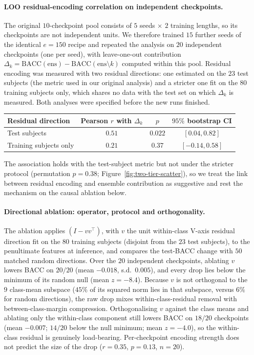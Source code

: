 \begin{revblock}
\paragraph{LOO residual-encoding correlation on independent checkpoints.}
The original $10$-checkpoint pool consists of $5$ seeds $\times$ $2$
training lengths, so its checkpoints are not independent units. We
therefore trained $15$ further seeds of the identical $e{=}150$ recipe
and repeated the analysis on $20$ independent checkpoints (one per seed),
with leave-one-out contribution $\Delta_k=\mathrm{BACC}(\mathrm{ens})-
\mathrm{BACC}(\mathrm{ens}\setminus k)$ computed within this pool. Residual
encoding was measured with two residual directions: one estimated on the
$23$ test subjects (the metric used in our original analysis) and a
stricter one fit on the $80$ training subjects only, which shares no data
with the test set on which $\Delta_k$ is measured. Both analyses were
specified before the new runs finished.

\begin{center}
\small
\begin{tabular}{lccc}
\toprule
Residual direction & Pearson $r$ with $\Delta_k$ & $p$ & $95\%$ bootstrap CI \\
\midrule
Test subjects   & $0.51$ & $0.022$ & $[0.04, 0.82]$ \\
Training subjects only & $0.21$ & $0.37$ & $[-0.14, 0.58]$ \\
\bottomrule
\end{tabular}
\end{center}
The association holds with the test-subject metric but not under the
stricter protocol (permutation $p{=}0.38$; Figure~\ref{fig:two-tier-scatter}), so we treat the link between
residual encoding and ensemble contribution as suggestive and rest the
mechanism on the causal ablation below.

\paragraph{Directional ablation: operator, protocol and orthogonality.} The
ablation applies $(I-vv^\top)$, with $v$ the unit within-class V-axis
residual direction fit on the $80$ training subjects (disjoint from the
$23$ test subjects), to the penultimate features at inference, and
compares the test-BACC change with $50$ matched random directions. Over
the $20$ independent checkpoints, ablating $v$ lowers BACC on $20/20$
(mean $-0.018$, s.d.\ $0.005$), and every drop lies below the minimum of
its random null (mean $z{=}{-}8.4$). Because $v$ is not orthogonal to the
$9$ class-mean subspace ($45\%$ of its squared norm lies in that
subspace, versus $6\%$ for random directions), the raw drop mixes
within-class-residual removal with between-class-margin compression.
Orthogonalising $v$ against the class means and ablating only the
within-class component still lowers BACC on $18/20$ checkpoints (mean
$-0.007$; $14/20$ below the null minimum; mean $z{=}{-}4.0$), so the
within-class residual is genuinely load-bearing. Per-checkpoint encoding
strength does not predict the size of the drop ($r{=}0.35$, $p{=}0.13$,
$n{=}20$).


\end{revblock}
